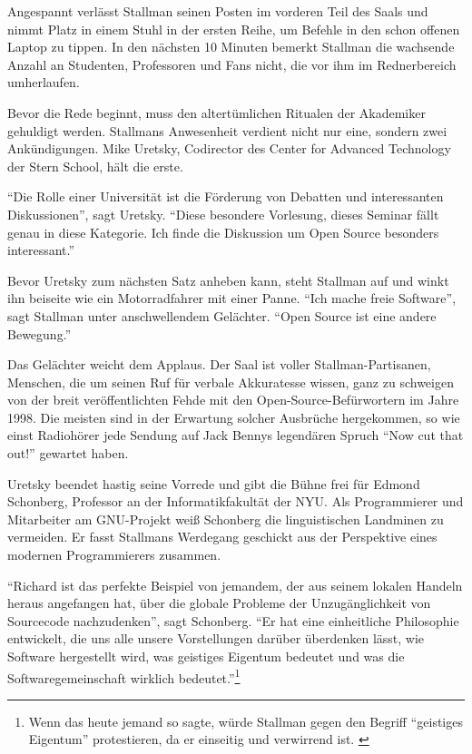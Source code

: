 Angespannt verlässt Stallman seinen Posten im vorderen Teil des Saals und nimmt Platz in einem Stuhl in der ersten Reihe, um Befehle in den schon offenen Laptop zu tippen. In den nächsten 10 Minuten bemerkt Stallman die wachsende Anzahl an Studenten, Professoren und Fans nicht, die vor ihm im Rednerbereich umherlaufen.

Bevor die Rede beginnt, muss den altertümlichen Ritualen der Akademiker gehuldigt werden. Stallmans Anwesenheit verdient nicht nur eine, sondern zwei Ankündigungen. Mike Uretsky, Codirector des Center for Advanced Technology der Stern School, hält die erste. 

"`Die Rolle einer Universität ist die Förderung von Debatten und interessanten Diskussionen"', sagt Uretsky. "`Diese besondere Vorlesung, dieses Seminar fällt genau in diese Kategorie. Ich finde die Diskussion um Open Source besonders interessant."' 

Bevor Uretsky zum nächsten Satz anheben kann, steht Stallman auf und winkt ihn beiseite wie ein Motorradfahrer mit einer Panne. "`Ich mache freie Software"', sagt Stallman unter anschwellendem Gelächter. "`Open Source ist eine andere Bewegung."'

Das Gelächter weicht dem Applaus. Der Saal ist voller Stallman-Partisanen, Menschen, die um seinen Ruf für verbale Akkuratesse wissen, ganz zu schweigen von der breit veröffentlichten Fehde mit den Open-Source-Befürwortern im Jahre 1998. Die meisten sind in der Erwartung solcher Ausbrüche hergekommen, so wie einst Radiohörer jede Sendung auf Jack Bennys legendären Spruch "`Now cut that out!"' gewartet haben.

Uretsky beendet hastig seine Vorrede und gibt die Bühne frei für Edmond Schonberg, Professor an der Informatikfakultät der NYU. Als Programmierer und Mitarbeiter am GNU-Projekt weiß Schonberg die linguistischen Landminen zu vermeiden. Er fasst Stallmans Werdegang geschickt aus der Perspektive eines modernen Programmierers zusammen.

"`Richard ist das perfekte Beispiel von jemandem, der aus seinem lokalen Handeln heraus angefangen hat, über die globale Probleme der Unzugänglichkeit von Sourcecode nachzudenken"', sagt Schonberg. "`Er hat eine einheitliche Philosophie entwickelt, die uns alle unsere Vorstellungen darüber überdenken lässt, wie Software hergestellt wird, was geistiges Eigentum bedeutet und was die Softwaregemeinschaft wirklich bedeutet."'\footnote{Wenn das heute jemand so sagte, würde Stallman gegen den Begriff "`geistiges Eigentum"' protestieren, da er einseitig und verwirrend ist. \cite[Vgl.][]{ipr}}

